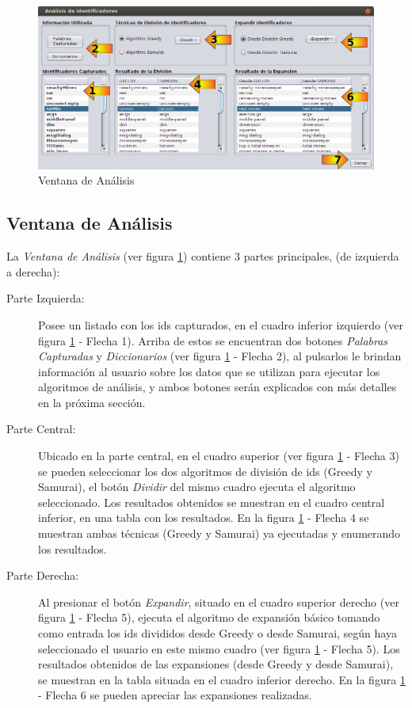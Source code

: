 \begin{figure}[h!] %
\centerline{%
\includegraphics[scale= 0.52]{./cap4/ida_06.png}
}
\caption{Ventana de Análisis}
\label{ida6}
\end{figure}

\subsection{Ventana de Análisis}

La \textit{Ventana de Análisis} (ver figura \ref{ida6}) contiene 3 partes principales, (de izquierda a derecha):

\begin{description}

\item[Parte Izquierda:] Posee un listado con los ids capturados, en el cuadro inferior izquierdo (ver figura \ref{ida6} - Flecha 1). Arriba de estos se encuentran dos botones \textit{Palabras Capturadas} y \textit{Diccionarios} (ver figura \ref{ida6} - Flecha 2), al pulsarlos le brindan información al usuario sobre los datos que se utilizan para ejecutar los algoritmos de análisis, y ambos botones serán explicados con más detalles en la próxima sección.

\item[Parte Central:] Ubicado en la parte central, en el cuadro superior (ver figura \ref{ida6} - Flecha 3) se pueden seleccionar los dos algoritmos de división de ids (Greedy y Samurai), el botón \textit{Dividir} del mismo cuadro ejecuta el algoritmo seleccionado. Los resultados obtenidos se muestran en el cuadro central inferior, en una tabla con los resultados. En la figura \ref{ida6} - Flecha 4 se muestran ambas técnicas (Greedy y Samurai) ya ejecutadas y enumerando los resultados.

\item[Parte Derecha:] Al presionar el botón \textit{Expandir}, situado en el cuadro superior derecho (ver figura \ref{ida6} - Flecha 5), ejecuta el algoritmo de expansión básico tomando como entrada los ids divididos desde Greedy o desde Samurai, según haya seleccionado el usuario en este mismo cuadro (ver figura \ref{ida6} - Flecha 5). Los resultados obtenidos de las expansiones (desde Greedy y desde Samurai), se muestran en la tabla situada en el cuadro inferior derecho. En la figura \ref{ida6} - Flecha 6 se pueden apreciar las expansiones realizadas.

\end{description}

